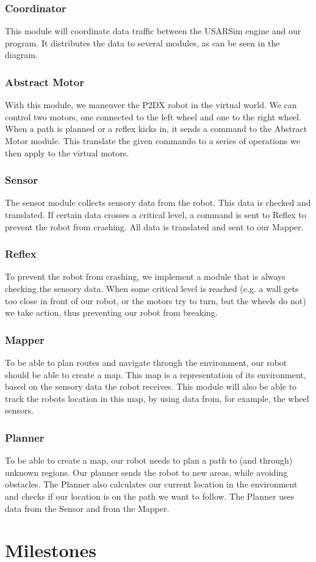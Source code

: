 \documentclass[a4paper, notitlepage]{article}
\begin{document}
\subsubsection{Coordinator}
This module will coordinate data traffic between the USARSim engine and
our program. It distributes the data to several modules, as can be
seen in the diagram.
\subsubsection{Abstract Motor}
With this module, we maneuver the P2DX robot in the virtual world. We
can control two motors, one connected to the left wheel and one to the
right wheel. When a path is planned or a reflex kicks in, it sends a
command to the Abstract Motor module. This translate the given
commando to a series of operations we then apply to the virtual motors.
\subsubsection{Sensor}
The sensor module collects sensory data from the robot. This data is
checked and translated. If certain data crosses a critical level, a
command is sent to Reflex to prevent the robot from crashing. All
data is translated and sent to our Mapper.
\subsubsection{Reflex}
To prevent the robot from crashing, we implement a module that is
always checking the sensory data. When some critical level is reached (e.g. a
wall gets too close in front of our robot, or the motors try to turn, but the
wheels do not) we take action, thus preventing our robot from breaking. 
\subsubsection{Mapper}
To be able to plan routes and navigate through the environment, our robot should
be able to create a map. This map is a representation of its environment, based
on the sensory data the robot receives. This module will also be able to track
the robots location in this map, by using data from, for example, the wheel
sensors.
\subsubsection{Planner}
To be able to create a map, our robot
needs to plan a path to (and through) unknown regions. Our planner sends the
robot to new areas, while avoiding obstacles. The Planner also
calculates our current location in the environment and checks if our
location is on the path we want to follow. The Planner uses data from
the Sensor and from the Mapper.

\section{Milestones}

\end{document}
